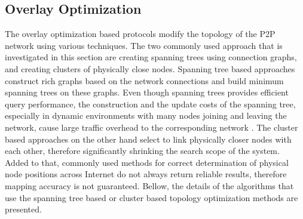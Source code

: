 

\subsection{Overlay Optimization}

%
%
%
%

The overlay optimization based protocols modify the topology of the P2P network
using various techniques. The two commonly used approach that is investigated in
this section are creating spanning trees using connection graphs, and creating
clusters of physically close nodes. Spanning tree based approaches construct
rich graphs based on the network connections and build minimum spanning trees on
these graphs. Even though spanning trees provides efficient query performance,
the construction and the update costs of the spanning tree, especially in
dynamic environments with many nodes joining and leaving the network, cause
large traffic overhead to the corresponding
network \cite{chu_esm_2000,chu_esm_2002}. The cluster based approaches on the
other hand select to link physically closer nodes with each other, therefore
significantly shrinking the search scope of the system. Added to that, commonly
used methods for correct determination of physical node positions across
Internet do not always return reliable results, therefore mapping accuracy is
not guaranteed. Bellow, the details of the algorithms that use the spanning tree
based or cluster based topology optimization methods are presented.


